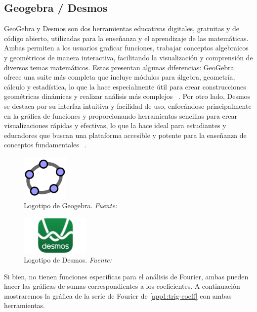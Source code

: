 \subsection{Geogebra / Desmos}
GeoGebra y Desmos son dos herramientas educativas digitales, gratuitas y de código abierto, utilizadas para la enseñanza y el aprendizaje de las matemáticas. Ambas permiten a los usuarios graficar funciones, trabajar conceptos algebraicos y geométricos de manera interactiva, facilitando la visualización y comprensión de diversos temas matemáticos. Estas presentan algunas diferencias: GeoGebra ofrece una suite más completa que incluye módulos para álgebra, geometría, cálculo y estadística, lo que la hace especialmente útil para crear construcciones geométricas dinámicas y realizar análisis más complejos ~\cite{GeoGebra2024}. Por otro lado, Desmos se destaca por su interfaz intuitiva y facilidad de uso, enfocándose principalmente en la gráfica de funciones y proporcionando herramientas sencillas para crear visualizaciones rápidas y efectivas, lo que la hace ideal para estudiantes y educadores que buscan una plataforma accesible y potente para la enseñanza de conceptos fundamentales ~\cite{Desmos2024}.

\begin{figure}[H]
	\centering
	\includegraphics[width=0.2\textwidth]{img/chapter02/logo_geogebra.png}
	\caption[Logotipo de Geogebra.]{Logotipo de Geogebra. \textit{Fuente: ~\cite{GeoGebra2024}}}
	\label{fig:logo-geogebra}
\end{figure}


\begin{figure}[H]
	\centering
	\includegraphics[width=0.3\textwidth]{img/chapter02/logo_desmos.jpg} 
	\caption[Logotipo de Desmos.]{Logotipo de Desmos. \textit{Fuente: ~\cite{Desmos2024}}}
	\label{fig:logo-desmos}
\end{figure}

Si bien, no tienen funciones especificas para el análisis de Fourier, ambas pueden hacer las gráficas de sumas correspondientes a los coeficientes. A continuación mostraremos la gráfica de la serie de Fourier de \ref{app1:trig-coeff} con ambas herramientas.

